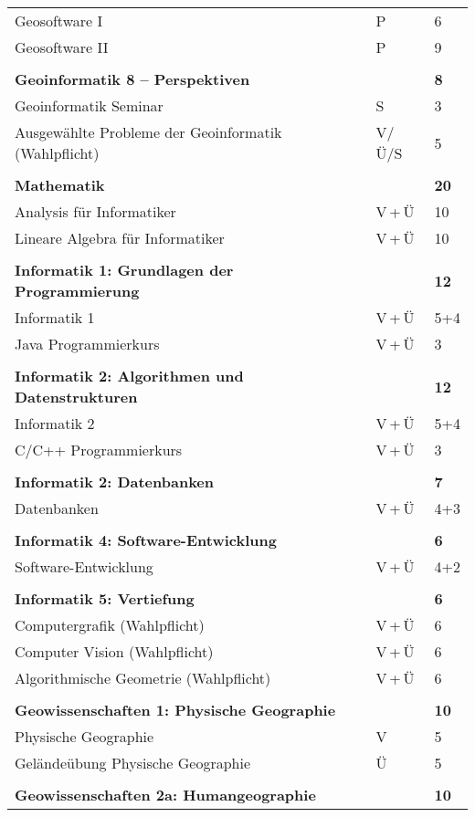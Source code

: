 \begin{longtable}{p{} p{} p{}}
Geosoftware I & P & 6\\
Geosoftware II & P & 9\\
&&\\
\textbf{Geoinformatik 8 -- Perspektiven}&& \textbf{8}\\
Geoinformatik Seminar & S & 3\\
Ausgewählte Probleme der Geoinformatik (Wahlpflicht) & V/Ü/S & 5\\
&&\\
\textbf{Mathematik}&& \textbf{20}\\
Analysis für Informatiker  & V\,+\,Ü & 10\\
Lineare Algebra für Informatiker & V\,+\,Ü & 10\\
&&\\
\textbf{Informatik 1: Grundlagen der Programmierung} & & \textbf{12}\\
Informatik 1 & V\,+\,Ü & 5+4\\
Java Programmierkurs & V\,+\,Ü & 3\\
&&\\
\textbf{Informatik 2: Algorithmen und Datenstrukturen} & & \textbf{12}\\
Informatik 2 & V\,+\,Ü & 5+4\\
C/C++ Programmierkurs & V\,+\,Ü & 3\\
&&\\
\textbf{Informatik 2: Datenbanken} & & \textbf{7}\\
Datenbanken & V\,+\,Ü & 4+3\\
&&\\
\textbf{Informatik 4: Software-Entwicklung}& &\textbf{6}\\
Software-Entwicklung & V\,+\,Ü & 4+2\\
&&\\
\textbf{Informatik 5: Vertiefung} & & \textbf{6}\\
Computergrafik (Wahlpflicht) & V\,+\,Ü & 6\\
Computer Vision (Wahlpflicht) & V\,+\,Ü & 6\\
Algorithmische Geometrie (Wahlpflicht) & V\,+\,Ü & 6\\
&&\\
\textbf{Geowissenschaften 1: Physische Geographie} & & \textbf{10}\\
Physische Geographie & V & 5\\
Geländeübung Physische Geographie & Ü & 5\\
&&\\
\textbf{Geowissenschaften 2a: Humangeographie} & & \textbf{10}\\

\end{longtable}
